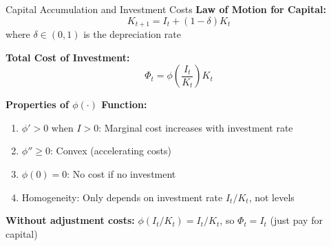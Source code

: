 \documentclass{beamer}
\begin{document}
\begin{frame}{Capital Accumulation and Investment Costs}
    \textbf{Law of Motion for Capital:}
    \begin{equation}\label{equ:capital accumulation}
        K_{t+1} = I_t + (1-\delta)K_t
    \end{equation}
    where $\delta \in (0,1)$ is the depreciation rate
    
    
    \textbf{Total Cost of Investment:}
    \begin{equation}\label{equ:investment cost}
        \Phi_t = \phi\left(\frac{I_t}{K_t}\right) K_t
    \end{equation}
    
    \textbf{Properties of $\phi(\cdot)$ Function:}
    \begin{enumerate}
        \item $\phi' > 0$ when $I > 0$: Marginal cost increases with investment rate
        \item $\phi'' \geq 0$: Convex (accelerating costs)
        \item $\phi(0) = 0$: No cost if no investment
        \item Homogeneity: Only depends on investment rate $I_t/K_t$, not levels
    \end{enumerate}
    
    \vspace{0.2cm}
    \textbf{Without adjustment costs:} $\phi(I_t/K_t) = I_t/K_t$, so $\Phi_t = I_t$ (just pay for capital)
\end{frame}
\end{document}

